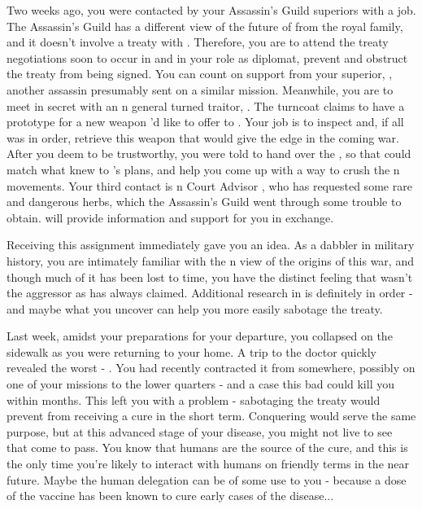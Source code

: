 \documentclass[char]{NeptuneBall}
\begin{document}
Two weeks ago, you were contacted by your Assassin's Guild superiors with a job. The Assassin's Guild has a different view of the future of \pPacifica{} from the royal family, and it doesn't involve a treaty with \pAtlantis{}. Therefore, you are to attend the treaty negotiations soon to occur in \pAtlantis{} and in your role as diplomat, prevent and obstruct the treaty from being signed. You can count on support from your superior, \cDiplomat{}, another assassin presumably sent on a similar mission. Meanwhile, you are to meet in secret with an \pAtlantis{}n general turned traitor, \cGeneral{}. The turncoat claims to have a prototype for a new weapon \cGeneral{\they}'d like to offer to \pPacifica{}. Your job is to inspect and, if all was in order, retrieve this weapon that would give \pPacifica{} the edge in the coming war. After you deem \cGeneral{\them} to be trustworthy, you were told to hand over the \iBattlePlan{}, so that \cGeneral{\they} could match what \cGeneral{\they} knew to \pPacifica{}'s plans, and help you come up with a way to crush the \pAtlantis{}n movements. Your third contact is \pAtlantis{}n Court Advisor \cManta{}, who has requested some rare and dangerous herbs, which the Assassin's Guild went through some trouble to obtain. \cManta{\They} will provide information and support for you in exchange. 

Receiving this assignment immediately gave you an idea. As a dabbler in military history, you are intimately familiar with the \pPacifica{}n view of the origins of this war, and though much of it has been lost to time, you have the distinct feeling that \pPacifica{} wasn't the aggressor as \pAtlantis{} has always claimed. Additional research in \pAtlantis{} is definitely in order - and maybe what you uncover can help you more easily sabotage the treaty. 

Last week, amidst your preparations for your departure, you collapsed on the sidewalk as you were returning to your home. A trip to the doctor quickly revealed the worst - \pPolio{}. You had recently contracted it from somewhere, possibly on one of your missions to the lower quarters - and a case this bad could kill you within months. This left you with a problem - sabotaging the treaty would prevent \pPacifica{} from receiving a cure in the short term. Conquering \pAtlantis{} would serve the same purpose, but at this advanced stage of your disease, you might not live to see that come to pass. You know that humans are the source of the cure, and this is the only time you're likely to interact with humans on friendly terms in the near future. Maybe the human delegation can be of some use to you - because a dose of the vaccine has been known to cure early cases of the disease...
\end{document}
